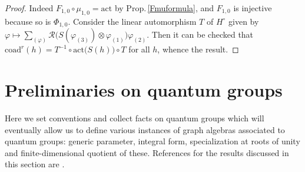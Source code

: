 \documentclass[11pt]{amsart}
\begin{document}
\begin{proof} Indeed $F_{1,0} \circ \mu_{1,0} = \mathrm{act}$ by Prop.\,\ref{Fmuformula}, and $F_{1,0}$ is injective because so is $\Phi_{1,0}$. Consider the linear automorphism $T$ of $H^\circ$ given by $\varphi \mapsto \textstyle \sum_{(\varphi)}\mathcal{R}\bigl( S(\varphi_{(3)}) \otimes \varphi_{(1)} \bigr)\varphi_{(2)}$. Then it can be checked that $\mathrm{coad}^r(h) = T^{-1} \circ \mathrm{act}\bigl( S(h) \bigr) \circ T$ for all $h$, whence the result.
\end{proof}





\section{Preliminaries on quantum groups}\label{sectionPreliminaires}
Here we set conventions and collect facts on quantum groups which will eventually allow us to define various instances of graph algebras associated to quantum groups: generic parameter, integral form, specialization at roots of unity and finite-dimensional quotient of these. References for the results discussed in this section are \cite{CP,BG,VY}.
\end{document}
